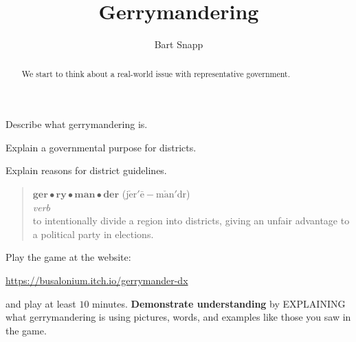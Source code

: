 \documentclass[noauthor,nooutcomes,hints,handout,12pt]{ximera}
\title{Gerrymandering}
\author{Bart Snapp}
\begin{document}
\begin{abstract}
  We start to think about a real-world issue with representative government.
\end{abstract}
\maketitle

\begin{listOutcomes}
\item Describe what gerrymandering is.
\item Explain a governmental purpose for districts.
\item Explain reasons for district guidelines.
\end{listOutcomes}
\begin{mdframed}[style=OutcomeStyle]
\begin{quote}
  $\textbf{ger}\bullet\textbf{ry}\bullet\textbf{man}\bullet\textbf{der}$ (j$\check{\text{e}}$r$'\bar{\text{e}}-$m$\check{\text{a}}$n$'$d{}r)
  \\
  
  \textit{verb}\\

  
\quad to intentionally divide a region into districts, giving an
unfair advantage to a political party in elections.
\end{quote}
\end{mdframed}




\mynewpage






\begin{question}
  Play the game  at the website:
  \begin{center}
    \url{https://busalonium.itch.io/gerrymander-dx}
  \end{center}
  and play at least $10$ minutes.  
  \textbf{Demonstrate understanding} by EXPLAINING what gerrymandering is using pictures, words, and examples like those you saw in the game.
  
\end{question}


\mynewpage
\end{document}
